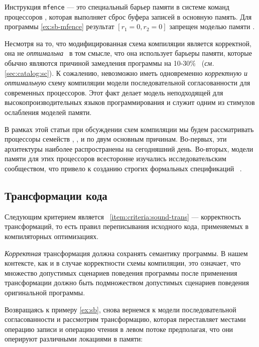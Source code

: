 Инструкция \texttt{mfence} --- это специальный барьер памяти в системе команд процессоров 
\Intel, которая выполняет сброс буфера записей в основную память. 
Для программы \ref{ex:sb-mfence} результат ${[r_1=0, r_2=0]}$
запрещен моделью памяти \Intel. 

Несмотря на то, что модифицированная схема компиляции является корректной, 
она не \emph{оптимальна}~\cite{OptimalCompilationCPP}
в том смысле, что она использует барьеры памяти,
которые обычно являются причиной замедления программы 
на 10-30\%~\cite{Marino-al:PLDI11, Liu-al:OOPSLA17}
(\emph{см.} \cref{sec:catalog:sc}).
К сожалению, невозможно иметь одновременно \emph{корректную и оптимальную} 
схему компиляции модели последовательной согласованности 
для современных процессоров. 
Этот факт делает модель \SC неподходящей 
для высокопроизводительных языков программирования 
и служит одним из стимулов ослабления моделей памяти. 

В рамках этой статьи при обсуждении 
схем компиляции мы будем рассматривать процессоры семейств
\Intel, ,  и \POWER 
по двум основным причинам. 
Во-первых, эти архитектуры наиболее 
распространены на сегодняшний день. 
Во-вторых, модели памяти для этих процессоров 
всесторонне изучались исследовательским сообществом, 
что привело к созданию строгих 
формальных спецификаций~%
\cite{Sewell-al:CACM10, Sarkar-al:PLDI11, 
Flur-al:POPL16, Pulte-al:POPL18}. 

\subsection{Трансформации кода}
\label{sec:background:trans}

Следующим критерием является ~\ref{item:criteria:sound-trans} ---
корректность трансформаций, то есть правил переписывания 
исходного кода, применяемых в компиляторных оптимизациях. 

\emph{Корректная} трансформация должна сохранять семантику программы. 
В нашем контексте, как и в случае корректности схемы компиляции,
это означает, что множество допустимых сценариев поведения 
программы после применения трансформации должно 
быть подмножеством допустимых сценариев поведения оригинальной программы.

Возвращаясь к примеру \ref{ex:sb},
снова вернемся к модели последовательной согласованности 
и рассмотрим трансформацию, которая переставляет местами 
операцию записи и операцию чтения в левом потоке предполагая, 
что они оперируют различными локациями в памяти:

